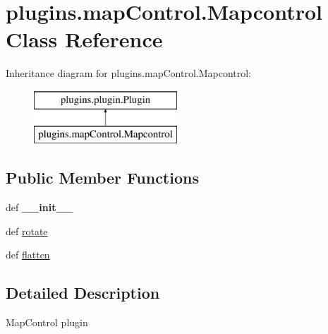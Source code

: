 \hypertarget{classplugins_1_1map_control_1_1_mapcontrol}{\section{plugins.\-map\-Control.\-Mapcontrol \-Class \-Reference}
\label{classplugins_1_1map_control_1_1_mapcontrol}
}
\-Inheritance diagram for plugins.\-map\-Control.\-Mapcontrol\-:\begin{figure}[H]
\begin{center}
\leavevmode
\includegraphics[height=2.000000cm]{classplugins_1_1map_control_1_1_mapcontrol}
\end{center}
\end{figure}
\subsection*{\-Public \-Member \-Functions}
\begin{DoxyCompactItemize}
\item 
\hypertarget{classplugins_1_1map_control_1_1_mapcontrol_a32d35da2a9356837206866102617c0ba}{def {\bfseries \-\_\-\-\_\-init\-\_\-\-\_\-}}\label{classplugins_1_1map_control_1_1_mapcontrol_a32d35da2a9356837206866102617c0ba}

\item 
def \hyperlink{classplugins_1_1map_control_1_1_mapcontrol_a558d32c4dcc5cd633ec12ca6dc76d9d3}{rotate}
\item 
def \hyperlink{classplugins_1_1map_control_1_1_mapcontrol_a88605d551afe6cb5b868645848df40ef}{flatten}
\end{DoxyCompactItemize}


\subsection{\-Detailed \-Description}
\begin{DoxyVerb}MapControl plugin \end{DoxyVerb}
 

